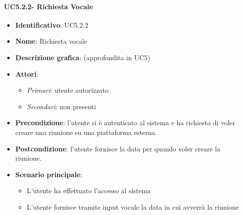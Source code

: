 \paragraph{UC5.2.2- Richiesta Vocale}
\begin{itemize}
   \item \textbf{Identificativo}: UC5.2.2
   \item \textbf{Nome}: Richiesta vocale
   \item \textbf{Descrizione grafica}: (approfondita in UC5)
   \item \textbf{Attori}:
   \begin{itemize} 
       \item \textit{Primari}: utente autorizzato
       \item \textit{Secondari}: non presenti
   \end{itemize}
       \item \textbf{Precondizione}: l'utente si è autenticato al sistema e ha richiesto di voler creare una riunione su una piattaforma esterna.
       \item \textbf{Postcondizione}: l'utente fornisce la data per quando voler creare la riunione.
    \item \textbf{Scenario principale}: 
       \begin{itemize}
           \item L'utente ha effettuato l'accesso al sistema 
           \item L'utente fornisce tramite input vocale la data in cui avverrà la riunione
       \end{itemize}
\end{itemize}

